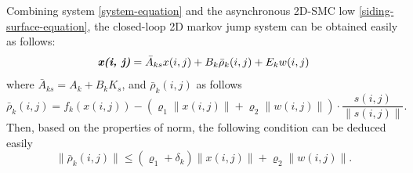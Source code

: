 \documentclass[conference]{IEEEtran}
\begin{document}
	Combining system \eqref{system-equation} and the asynchronous 2D-SMC low \eqref{siding-surface-equation}, the closed-loop 2D markov jump system can be obtained easily as follows:
	\begin{equation} \label{closed-loop-system-equation}
	\emph{\textbf{x(i, j)}} = \bar{A}_{ks}x(i,j)+B_{k}\bar{\rho}_{k}(i,j)+E_{k}w(i,j)
	\end{equation}
	where $\bar{A}_{ks} = A_{k}+B_{k}K_{s}$, and $\bar{\rho}_{k}(i,j)$ as follows
	\begin{equation*}
	\bar\rho_{k}(i,j)=f_{k}(x(i,j))-(\varrho_{1}\|x(i,j)\|+\varrho_{2}\|w(i,j)\|)\cdot\frac{s(i,j)}{\|s(i,j)\|}.
	\end{equation*}
	Then, based on the properties of norm, the following condition can be deduced easily
	\begin{equation}\label{norm-rho-inequality}
	\|\bar{\rho}_{k}(i,j)\| \leq (\varrho_{1}+\delta_{k})\|x(i,j)\| + \varrho_{2}\|w(i,j)\| .
	\end{equation} 
		
\end{document}
